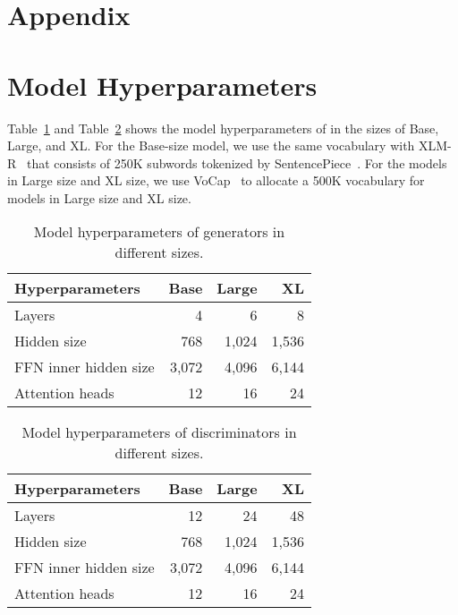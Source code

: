 \documentclass[11pt]{article}
\newcommand\our{\makebox{\textsc{XLM-E}}}
\begin{document}



\newpage
\appendix

\section*{Appendix}

\section{Model Hyperparameters}
\label{appendix:params_model}

Table~\ref{table:g-hparam} and Table~\ref{table:d-hparam} shows the model hyperparameters of \our{} in the sizes of Base, Large, and XL. 
For the Base-size model, we use the same vocabulary with XLM-R~\cite{xlmr} that consists of 250K subwords tokenized by SentencePiece~\cite{sentencepiece}. For the models in Large size and XL size, we use VoCap~\cite{vocap} to allocate a 500K vocabulary for models in Large size and XL size.

\begin{table}[ht]
\centering
\small
\renewcommand\tabcolsep{2.8pt}
\begin{tabular}{lrrr}
\toprule
Hyperparameters & Base & Large & XL \\ \midrule
Layers & 4 & 6 & 8 \\
Hidden size & 768 & 1,024 & 1,536 \\
FFN inner hidden size & 3,072 & 4,096 & 6,144 \\
Attention heads & 12 & 16 & 24 \\
\bottomrule
\end{tabular}
\caption{Model hyperparameters of \our{} generators in different sizes.}
\label{table:g-hparam}
\end{table}

\begin{table}[ht]
\centering
\small
\renewcommand\tabcolsep{3.5pt}
\begin{tabular}{lrrr}
\toprule
Hyperparameters & Base & Large & XL \\ \midrule
Layers & 12 & 24 & 48 \\
Hidden size & 768 & 1,024 & 1,536 \\
FFN inner hidden size & 3,072 & 4,096 & 6,144 \\
Attention heads & 12 & 16 & 24 \\
\bottomrule
\end{tabular}
\caption{Model hyperparameters of \our{} discriminators in different sizes.}
\label{table:d-hparam}
\end{table}
\end{document}
